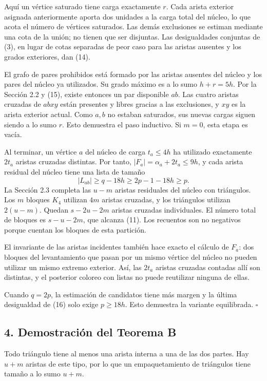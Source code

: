 \documentclass[spanish,11pt,a4paper]{article}
\begin{document}
Aquí un vértice saturado tiene carga exactamente \(r\). Cada arista
exterior asignada anteriormente aporta dos unidades a la carga total del
núcleo, lo que acota el número de vértices saturados. Las demás
exclusiones se estiman mediante una cota de la unión; no tienen que ser
disjuntas. Las desigualdades conjuntas de (3), en lugar de cotas
separadas de peor caso para las aristas ausentes y los grados
exteriores, dan (14).

El grafo de pares prohibidos está formado por las aristas ausentes del
núcleo y los pares del núcleo ya utilizados. Su grado máximo es a lo
sumo \(h+r=5h\). Por la Sección 2.2 y (15), existe entonces un par
disponible \(ab\). Las cuatro aristas cruzadas de \(abxy\) están
presentes y libres gracias a las exclusiones, y \(xy\) es la arista
exterior actual. Como \(a,b\) no estaban saturados, sus nuevas cargas
siguen siendo a lo sumo \(r\). Esto demuestra el paso inductivo. Si
\(m=0\), esta etapa es vacía.

Al terminar, un vértice \(a\) del núcleo de carga \(t_a\le4h\) ha
utilizado exactamente \(2t_a\) aristas cruzadas distintas. Por tanto,
\(|F_a|=\alpha_a+2t_a\le9h\), y cada arista residual del núcleo tiene
una lista de tamaño \[
|L_{ab}|\ge q-18h\ge2p-1-18h\ge p. \tag{16}
\] La Sección 2.3 completa las \(u-m\) aristas residuales del núcleo con
triángulos. Los \(m\) bloques \(K_4\) utilizan \(4m\) aristas cruzadas,
y los triángulos utilizan \(2(u-m)\). Quedan \(s-2u-2m\) aristas
cruzadas individuales. El número total de bloques es \(s-u-2m\), que
alcanza (11). Los recuentos son no negativos porque cuentan los bloques
de esta partición.

El invariante de las aristas incidentes también hace exacto el cálculo
de \(F_a\): dos bloques del levantamiento que pasan por un mismo vértice
del núcleo no pueden utilizar un mismo extremo exterior. Así, las
\(2t_a\) aristas cruzadas contadas allí son distintas, y el posterior
coloreo con listas no puede reutilizar ninguna de ellas.

Cuando \(q=2p\), la estimación de candidatos tiene más margen y la
última desigualdad de (16) solo exige \(p\ge18h\). Esto demuestra la
variante equilibrada. \(\square\)

\subsection{4. Demostración del Teorema
B}\label{demostraciuxf3n-del-teorema-b}

Todo triángulo tiene al menos una arista interna a una de las dos
partes. Hay \(u+m\) aristas de este tipo, por lo que un empaquetamiento
de triángulos tiene tamaño a lo sumo \(u+m\).
\end{document}
